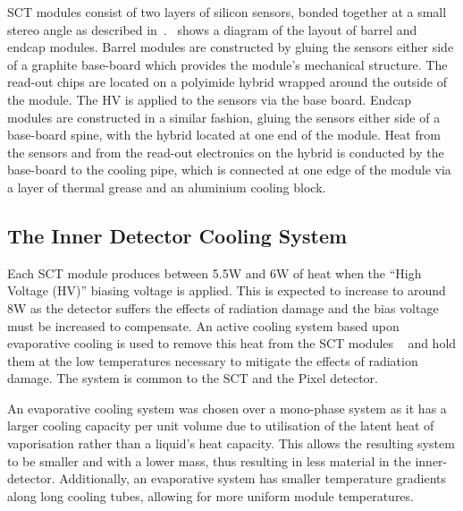 SCT modules consist of two layers of silicon sensors, bonded together at a small
stereo angle as described in~.~ shows a
diagram of the layout of barrel and endcap modules. Barrel modules are
constructed by gluing the sensors either side of a graphite base-board which
provides the module's mechanical structure. The read-out chips are located on a
polyimide hybrid wrapped around the outside of the module. The HV is applied to
the sensors via the base board. Endcap modules are constructed in a similar
fashion, gluing the sensors either side of a base-board spine, with the hybrid
located at one end of the module. Heat from the sensors and from the read-out
electronics on the hybrid is conducted by the base-board to the cooling pipe,
which is connected at one edge of the module via a layer of thermal grease and
an aluminium cooling block.

\subsection{The Inner Detector Cooling System}
\label{sec:SCT-CoolingDesc}
Each SCT module produces between 5.5W and 6W of heat when the ``High
Voltage (HV)'' biasing voltage is applied. This is expected
to increase to around 8W as the detector suffers the effects of radiation
damage and the bias voltage must be increased to compensate. 
An active cooling system based upon
evaporative cooling is used to remove this heat from the SCT modules
~\cite{1748-0221-3-07-P07003} and hold them at the low temperatures necessary to
mitigate the effects of radiation damage. The system is common to the SCT and
the Pixel detector. 

An evaporative cooling system was chosen over a mono-phase system as it has a
larger cooling capacity per unit volume due to utilisation of the latent heat of
vaporisation rather than a liquid's heat capacity. This allows the resulting
system to be smaller and with a lower mass, thus resulting in less material in
the inner-detector. Additionally, an evaporative system has
smaller temperature gradients along long cooling tubes, allowing for more
uniform module temperatures.

